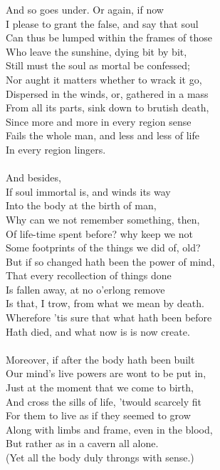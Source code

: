 And so goes under. Or again, if now\\
I please to grant the false, and say that soul\\
Can thus be lumped within the frames of those\\
Who leave the sunshine, dying bit by bit,\\
Still must the soul as mortal be confessed;\\
Nor aught it matters whether to wrack it go,\\
Dispersed in the winds, or, gathered in a mass\\
From all its parts, sink down to brutish death,\\
Since more and more in every region sense\\
Fails the whole man, and less and less of life\\
In every region lingers.\\
\\
And besides,\\
If soul immortal is, and winds its way\\
Into the body at the birth of man,\\
Why can we not remember something, then,\\
Of life-time spent before? why keep we not\\
Some footprints of the things we did of, old?\\
But if so changed hath been the power of mind,\\
That every recollection of things done\\
Is fallen away, at no o'erlong remove\\
Is that, I trow, from what we mean by death.\\
Wherefore 'tis sure that what hath been before\\
Hath died, and what now is is now create.\\
\\
Moreover, if after the body hath been built\\
Our mind's live powers are wont to be put in,\\
Just at the moment that we come to birth,\\
And cross the sills of life, 'twould scarcely fit\\
For them to live as if they seemed to grow\\
Along with limbs and frame, even in the blood,\\
But rather as in a cavern all alone.\\
(Yet all the body duly throngs with sense.)\\
